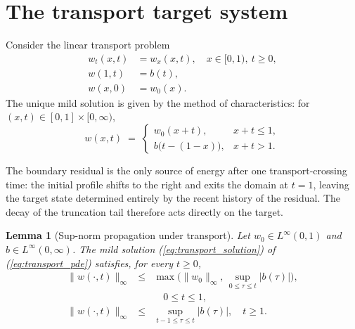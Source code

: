 \documentclass[amsthm]{autart}
\theoremstyle{plain}
\newtheorem{lemma}{Lemma}
\theoremstyle{definition}
\newcommand{\Linf}{L^\infty}
\begin{document}
\section{The transport target system}\label{sec:transport}

Consider the linear transport problem
\begin{align}
w_t(x,t) &= w_x(x,t), \quad x \in [0,1),\ t \ge 0, \label{eq:transport_pde}\\
w(1,t) &= b(t), \label{eq:transport_bdy}\\
w(x,0) &= w_0(x). \label{eq:transport_ic}
\end{align}
The unique mild solution is given by the method of characteristics: for $(x,t) \in [0,1] \times [0,\infty)$,
\begin{equation}
w(x,t) \;=\; \begin{cases} w_0(x + t), & x + t \le 1,\\ b\bigl(t - (1-x)\bigr), & x + t > 1. \end{cases}
\label{eq:transport_solution}
\end{equation}

The boundary residual is the only source of energy after one transport-crossing time: the initial profile shifts to the right and exits the domain at $t = 1$, leaving the target state determined entirely by the recent history of the residual. The decay of the truncation tail therefore acts directly on the target.

\begin{lemma}[Sup-norm propagation under transport]\label{lem:transport}
Let $w_0 \in \Linf(0,1)$ and $b \in \Linf(0,\infty)$. The mild solution (\ref{eq:transport_solution}) of (\ref{eq:transport_pde}) satisfies, for every $t \ge 0$,
\begin{eqnarray}
\|w(\cdot,t)\|_\infty &\le& \max\bigl(\|w_0\|_\infty,\, \sup_{0\le \tau \le t} |b(\tau)|\bigr), \nonumber \\
&& \quad 0 \le t \le 1, \nonumber \\
\|w(\cdot,t)\|_\infty &\le& \sup_{t-1 \le \tau \le t}|b(\tau)|, \quad t \ge 1.
\label{eq:transport_bound}
\end{eqnarray}
\end{lemma}
\end{document}
